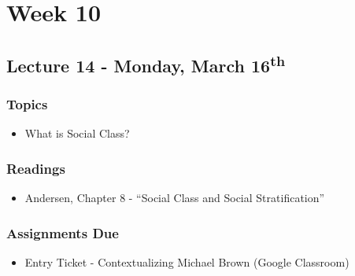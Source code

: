 \documentclass[]{book}
\providecommand{\tightlist}{%
  \setlength{\itemsep}{0pt}\setlength{\parskip}{0pt}}
\begin{document}
\newpage

\hypertarget{week-10}{%
\section*{Week 10}\label{week-10}}

\hypertarget{lecture-14---monday-march-16th}{%
\subsection*{\texorpdfstring{Lecture 14 - Monday, March 16\textsuperscript{th}}{Lecture 14 - Monday, March 16th}}\label{lecture-14---monday-march-16th}}

\hypertarget{topics-17}{%
\subsubsection*{Topics}\label{topics-17}}

\begin{itemize}
\tightlist
\item
  What is Social Class?
\end{itemize}

\hypertarget{readings-16}{%
\subsubsection*{Readings}\label{readings-16}}

\begin{itemize}
\tightlist
\item
  Andersen, Chapter 8 - ``Social Class and Social Stratification''
\end{itemize}

\hypertarget{assignments-due-3}{%
\subsubsection*{Assignments Due}\label{assignments-due-3}}

\begin{itemize}
\tightlist
\item
  Entry Ticket - Contextualizing Michael Brown (Google Classroom)
\end{itemize}
\end{document}
